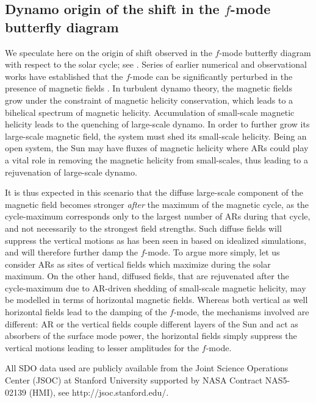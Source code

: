 \documentclass{aa}
\begin{document}
\subsection{Dynamo origin of the shift in the $f$-mode butterfly diagram}
We speculate here on the origin of shift observed in the $f$-mode butterfly diagram
with respect to the solar cycle; see .
Series of earlier numerical and observational works have established that the $f$-mode can be
significantly perturbed in the presence of magnetic fields \citep{S+14,S+15,SRB16,S+20}.
In turbulent dynamo theory, the magnetic fields grow under the constraint of magnetic helicity
conservation, which leads to a bihelical spectrum of magnetic helicity. Accumulation of small-scale
magnetic helicity leads to the quenching of large-scale dynamo. In order to further grow its large-scale
magnetic field, the system must shed its small-scale helicity. Being an open system, the Sun
may have fluxes of magnetic helicity where ARs could play a vital role in removing the magnetic
helicity from small-scales, thus leading to a rejuvenation of large-scale dynamo.

It is thus expected in this scenario that the diffuse large-scale component of the magnetic field
becomes stronger \emph{after} the maximum of the magnetic cycle, as the cycle-maximum corresponds
only to the largest number of ARs during that cycle, and not necessarily to the strongest field
strengths. Such diffuse fields will suppress the vertical motions as has been seen in \citet{S+15}
based on idealized simulations, and will therefore further damp the $f$-mode.
To argue more simply, let us consider ARs as sites of vertical fields which maximize during the
solar maximum. On the other hand, diffused fields, that are rejuvenated after the cycle-maximum due
to AR-driven shedding of small-scale magnetic helicity, may be modelled in terms of horizontal
magnetic fields. Whereas both vertical as well horizontal fields lead to the damping of the
$f$-mode, the mechanisms involved are different: AR or the vertical fields couple different layers
of the Sun and act as absorbers of the surface mode power, the horizontal fields simply suppress the
vertical motions leading to lesser amplitudes for the $f$-mode.

\begin{acknowledgements}
All SDO data used are publicly available from the Joint Science Operations Center (JSOC) at Stanford University supported by NASA Contract NAS5- 02139 (HMI), see http://jsoc.stanford.edu/. 
\end{acknowledgements}

{}

\end{document}

